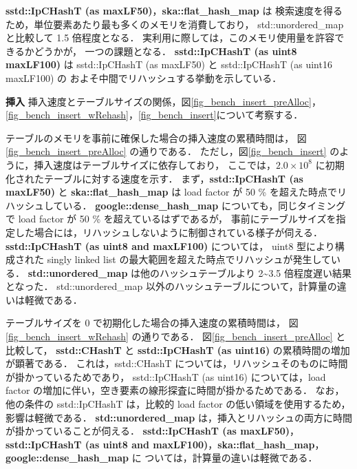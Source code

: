\noindent
{\bf sstd::IpCHashT (as maxLF50)}，{\bf ska::flat\_hash\_map} は
検索速度を得るため，単位要素あたり最も多くのメモリを消費しており，
std::unordered\_map と比較して 1.5 倍程度となる．
実利用に際しては，このメモリ使用量を許容できるかどうかが，
一つの課題となる．
{\bf sstd::IpCHashT (as uint8 maxLF100)} は
sstd::IpCHashT (as maxLF50) と sstd::IpCHashT (as uint16 maxLF100) の
およそ中間でリハッシュする挙動を示している．
\leavevmode \newline

%
{\bf 挿入}
\samepage\newline\indent
挿入速度とテーブルサイズの関係，図\ref{fig_bench_insert_preAlloc}，\ref{fig_bench_insert_wRehash}，\ref{fig_bench_insert}について考察する．

テーブルのメモリを事前に確保した場合の挿入速度の累積時間は，
図\ref{fig_bench_insert_preAlloc} の通りである．
ただし，図\ref{fig_bench_insert} のように，挿入速度はテーブルサイズに依存しており，
ここでは，$2.0\times10^8$ に初期化されたテーブルに対する速度を示す．
まず，{\bf sstd::IpCHashT (as maxLF50)} と {\bf ska::flat\_hash\_map} は load factor が 50 \% を超えた時点でリハッシュしている．
{\bf google::dense\_hash\_map} についても，同じタイミングで load factor が 50 \% を超えているはずであるが，
事前にテーブルサイズを指定した場合には，リハッシュしないように制御されている様子が伺える．
{\bf sstd::IpCHashT (as uint8 and maxLF100)} については，
uint8 型により構成された singly linked list の最大範囲を超えた時点でリハッシュが発生している．
{\bf std::unordered\_map} は他のハッシュテーブルより 2\textasciitilde 3.5 倍程度遅い結果となった．
std::unordered\_map 以外のハッシュテーブルについて，計算量の違いは軽微である．

テーブルサイズを 0 で初期化した場合の挿入速度の累積時間は，
図\ref{fig_bench_insert_wRehash} の通りである．
図\ref{fig_bench_insert_preAlloc} と比較して，
{\bf sstd::CHashT} と {\bf sstd::IpCHashT (as uint16)} の累積時間の増加が顕著である．
これは，sstd::CHashT については，リハッシュそのものに時間が掛かっているためであり，
sstd::IpCHashT (as uint16) については，load factor の増加に伴い，空き要素の線形探査に時間が掛かるためである．
なお，他の条件の sstd::IpCHashT は，比較的 load factor の低い領域を使用するため，影響は軽微である．
{\bf std::unordered\_map} は，挿入とリハッシュの両方に時間が掛かっていることが伺える．
{\bf sstd::IpCHashT (as maxLF50)}，{\bf sstd::IpCHashT (as uint8 and maxLF100)}，{\bf ska::flat\_hash\_map}，{\bf google::dense\_hash\_map} に
ついては，計算量の違いは軽微である．

